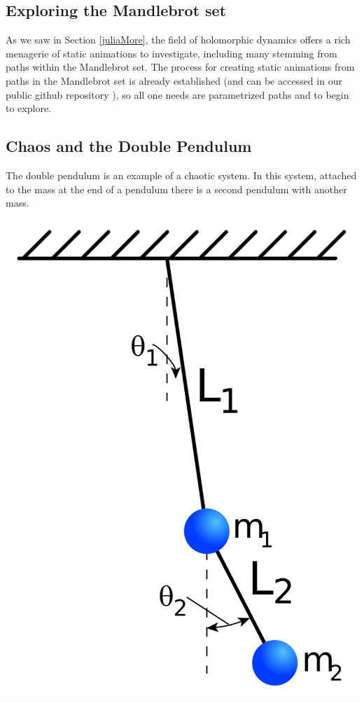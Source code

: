 \documentclass[12 pt]{article}
\begin{document}
\subsection{Exploring the Mandlebrot set}
As we saw in Section \ref{juliaMore}, the field of holomorphic dynamics offers a rich menagerie of static animations to investigate, including many stemming from paths within the Mandlebrot set. The process for creating static animations from paths in the Mandlebrot set is already established (and can be accessed in our public github repository \cite{github}), so all one needs are parametrized paths and to begin to explore.
\subsection{Chaos and the Double Pendulum}
The double pendulum \cite{chaos} is an example of a chaotic system.  In this system, attached to the mass at the end of a pendulum there is a second pendulum with another mass.
\begin{center}
    \includegraphics[width=.15\paperwidth]{images/Double-Pendulum.png}
    \cite{wikipedia}
\end{center}
\end{document}
